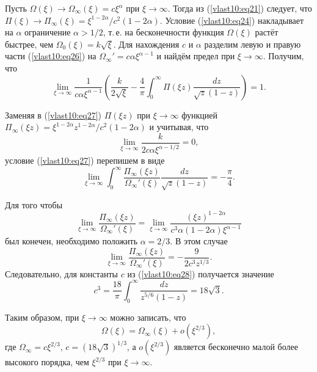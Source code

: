 Пусть $\Omega ( \xi )\to{\Omega
_\infty } ( \xi ) = c {\xi^ \alpha }$ при $\xi  \to \infty
$. Тогда из
(\ref{vlast10:eq21})
следует, что $\Pi ( \xi )\to{\Pi _\infty
}( \xi ) = {\xi^{1 - 2 \alpha }}/{c^2}( 1 - 2 \alpha)$. Условие (\ref{vlast10:eq24})
накладывает на $\alpha $ ограничение
\mbox{$\alpha  > 1/2$,} т.\,е. на бесконечности
функция $\Omega ( \xi )$ растёт
быстрее, чем ${\Omega _0}( \xi ) = k \sqrt
\xi $. Для нахождения $c$ и $\alpha
$ разделим левую и правую части (\ref{vlast10:eq26})
на ${\Omega _\infty }' = c\alpha {\xi ^{\alpha  -
1}}$ и найдём предел при $\xi  \to \infty
$. Получим, что
\begin{equation}
\lim \limits_{\xi  \to \infty }
\frac{1}{{c\alpha {\xi ^{\alpha  - 1}}}}\left( {\frac{k}{{2\sqrt \xi
}} - \frac{4}{\pi }\int _0^\infty  {\Pi ( \xi z )}
\frac{{dz}}{{\sqrt z (1 - z)}}} \right) = 1.\label{vlast10:eq27}
\end{equation}

Заменяя в (\ref{vlast10:eq27})
$\Pi ( \xi z )$ при
$\xi  \to \infty $ функцией
\mbox{$\Pi_\infty (\xi z) = \xi^{1 -
2\alpha }{z^{1 - 2\alpha }}/{c^2}(1 - 2\alpha )$} и учитывая,
что $$\lim \limits_{\xi  \to \infty }
\dfrac{k}{{2c\alpha {\xi^{\alpha  - 1/2}}}} = 0,$$ условие
(\ref{vlast10:eq27})
перепишем в виде
\begin{equation}
\lim \limits_{\xi  \to \infty }
\int _0^\infty  \dfrac{{\Pi_\infty(\xi z )}}{{{\Omega _\infty }'( \xi )}} \dfrac{{dz}}{{\sqrt z
(1 - z)}} =  - \dfrac{\pi}{4}. \label{vlast10:eq28}
\end{equation}

Для того чтобы $$\lim \limits_{\xi
\to \infty } \dfrac{\Pi_\infty (\xi z)}{{\Omega
_\infty '( \xi )}}=\lim \limits_{\xi  \to \infty } \dfrac{( \xi z )^{1 -
2\alpha}}{c^3\alpha (1 - 2\alpha ){\xi^{\alpha  -
1}}}$$ был конечен, необходимо положить
$\alpha  = 2/3$. В этом случае
$$\lim \limits_{\xi  \to \infty }
\dfrac{\Pi _\infty ( \xi z)}{\Omega_\infty '(
\xi )} =  - \dfrac{9}{2c^3z^{1/3}}.$$
Следовательно, для константы $c$ из (\ref{vlast10:eq28}) получается значение
\begin{equation}
c^3 = \dfrac{18}{\pi }\int _0^\infty
\dfrac{dz}{z^{5/6}(1 - z)} = 18 \sqrt 3. \label{vlast10:eq29}
\end{equation}

Таким образом, при $\xi  \to \infty
$ можно записать, что
\begin{equation}
\Omega ( \xi ) = \Omega_\infty (\xi) + o(\xi^{2/3}),\label{vlast10:eq30}
\end{equation}
где  $\Omega_\infty  = c \xi^{2/3}$, $c = (18\sqrt 3)^{1/3}$, а $o(\xi
^{2/3})$ является бесконечно малой более высокого порядка,
чем ${\xi ^{2/3}}$ при
$\xi  \to \infty $.

